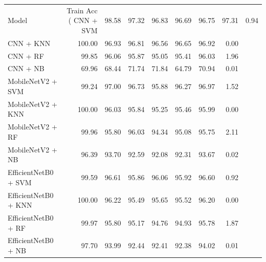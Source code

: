 \begin{tabular}{lrrrrrrr}
\toprule
Model & Train Acc (%
\midrule
CNN + SVM & 98.58 & 97.32 & 96.83 & 96.69 & 96.75 & 97.31 & 0.94 \\
CNN + KNN & 100.00 & 96.93 & 96.81 & 96.56 & 96.65 & 96.92 & 0.00 \\
CNN + RF & 99.85 & 96.06 & 95.87 & 95.05 & 95.41 & 96.03 & 1.96 \\
CNN + NB & 69.96 & 68.44 & 71.74 & 71.84 & 64.79 & 70.94 & 0.01 \\
MobileNetV2 + SVM & 99.24 & 97.00 & 96.73 & 95.88 & 96.27 & 96.97 & 1.52 \\
MobileNetV2 + KNN & 100.00 & 96.03 & 95.84 & 95.25 & 95.46 & 95.99 & 0.00 \\
MobileNetV2 + RF & 99.96 & 95.80 & 96.03 & 94.34 & 95.08 & 95.75 & 2.11 \\
MobileNetV2 + NB & 96.39 & 93.70 & 92.59 & 92.08 & 92.31 & 93.67 & 0.02 \\
EfficientNetB0 + SVM & 99.59 & 96.61 & 95.86 & 96.06 & 95.92 & 96.60 & 0.92 \\
EfficientNetB0 + KNN & 100.00 & 96.22 & 95.49 & 95.65 & 95.52 & 96.20 & 0.00 \\
EfficientNetB0 + RF & 99.97 & 95.80 & 95.17 & 94.76 & 94.93 & 95.78 & 1.87 \\
EfficientNetB0 + NB & 97.70 & 93.99 & 92.44 & 92.41 & 92.38 & 94.02 & 0.01 \\
\bottomrule
\end{tabular}
